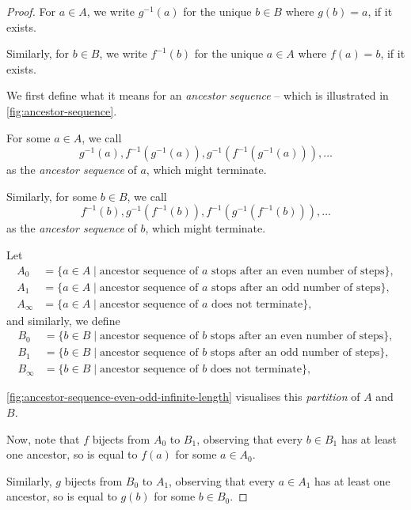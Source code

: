 \documentclass{article}
\theoremstyle{definition}
\theoremstyle{remark}
\newcommand{\pqty}[1]{\left(#1\right)}
\newcommand{\set}[2]{\{#1\mid #2\}}
\newcommand{\inverse}{^{-1}}
\begin{document}
\begin{proof}
    For \(a \in A\), we write \(g\inverse\pqty{a}\) for the unique \(b \in B\) where \(g\pqty{b} = a\), if it exists.

    Similarly, for \(b \in B\), we write \(f\inverse\pqty{b}\) for the unique \(a \in A\) where \(f\pqty{a} = b\), if it exists.

    We first define what it means for an \emph{ancestor sequence} -- which is illustrated in \autoref{fig:ancestor-sequence}.

    For some \(a \in A\), we call
    \[
        g\inverse\pqty{a}, f\inverse \pqty{g\inverse \pqty{a}}, g\inverse \pqty{f\inverse \pqty{g\inverse \pqty{a}}}, \ldots
    \]
    as the \emph{ancestor sequence} of \(a\), which might terminate.

    Similarly, for some \(b \in B\), we call
    \[
        f\inverse\pqty{b}, g\inverse \pqty{f\inverse \pqty{b}}, f\inverse \pqty{g\inverse \pqty{f\inverse \pqty{b}}}, \ldots
    \]
    as the \emph{ancestor sequence} of \(b\), which might terminate.

    Let
    \begin{align*}
        A_0 &= \set{a \in A}{\text{ancestor sequence of } a \text{ stops after an even number of steps}}, \\
        A_1 &= \set{a \in A}{\text{ancestor sequence of } a \text{ stops after an odd number of steps}}, \\
        A_{\infty} &= \set{a \in A}{\text{ancestor sequence of } a \text{ does not terminate}},
    \end{align*}
    and similarly, we define
    \begin{align*}
        B_0 &= \set{b \in B}{\text{ancestor sequence of } b \text{ stops after an even number of steps}}, \\
        B_1 &= \set{b \in B}{\text{ancestor sequence of } b \text{ stops after an odd number of steps}}, \\
        B_{\infty} &= \set{b \in B}{\text{ancestor sequence of } b \text{ does not terminate}},
    \end{align*}

    \autoref{fig:ancestor-sequence-even-odd-infinite-length} visualises this \emph{partition} of \(A\) and \(B\).
    
    Now, note that \(f\) bijects from \(A_0\) to \(B_1\), observing that every \(b \in B_1\) has at least one ancestor, so is equal to \(f\pqty{a}\) for some \(a \in A_0\).

    Similarly, \(g\) bijects from \(B_0\) to \(A_1\), observing that every \(a \in A_1\) has at least one ancestor, so is equal to \(g\pqty{b}\) for some \(b \in B_0\).


\end{proof}
\end{document}
